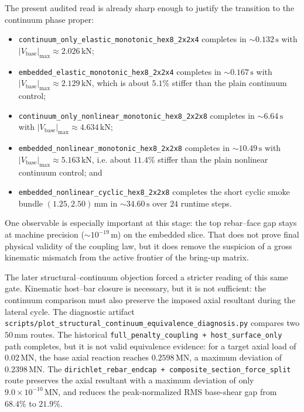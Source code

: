 The present audited read is already sharp enough to justify the transition to
the continuum phase proper:
\begin{itemize}
  \item \texttt{continuum\_only\_elastic\_monotonic\_hex8\_2x2x4} completes in
    \(\sim 0.132\,\mathrm{s}\) with
    \(|V_{\mathrm{base}}|_{\max} \approx 2.026\,\mathrm{kN}\);
  \item \texttt{embedded\_elastic\_monotonic\_hex8\_2x2x4} completes in
    \(\sim 0.167\,\mathrm{s}\) with
    \(|V_{\mathrm{base}}|_{\max} \approx 2.129\,\mathrm{kN}\), which is about
    \(5.1\%\) stiffer than the plain continuum control;
  \item \texttt{continuum\_only\_nonlinear\_monotonic\_hex8\_2x2x8} completes
    in \(\sim 6.64\,\mathrm{s}\) with
    \(|V_{\mathrm{base}}|_{\max} \approx 4.634\,\mathrm{kN}\);
  \item \texttt{embedded\_nonlinear\_monotonic\_hex8\_2x2x8} completes in
    \(\sim 10.49\,\mathrm{s}\) with
    \(|V_{\mathrm{base}}|_{\max} \approx 5.163\,\mathrm{kN}\), i.e. about
    \(11.4\%\) stiffer than the plain nonlinear continuum control; and
  \item \texttt{embedded\_nonlinear\_cyclic\_hex8\_2x2x8} completes the short
    cyclic smoke bundle \((1.25, 2.50)\,\mathrm{mm}\) in
    \(\sim 34.60\,\mathrm{s}\) over \(24\) runtime steps.
\end{itemize}

One observable is especially important at this stage: the top rebar--face gap
stays at machine precision (\(\sim 10^{-19}\,\mathrm{m}\)) on the embedded
slice. That does not prove final physical validity of the coupling law, but it
does remove the suspicion of a gross kinematic mismatch from the active
frontier of the bring-up matrix.

The later structural--continuum objection forced a stricter reading of this
same gate.  Kinematic host--bar closure is necessary, but it is not sufficient:
the continuum comparison must also preserve the imposed axial resultant during
the lateral cycle. The diagnostic artifact
\texttt{scripts/plot\_structural\_continuum\_equivalence\_diagnosis.py}
compares two \(50\,\mathrm{mm}\) routes. The historical
\texttt{full\_penalty\_coupling + host\_surface\_only} path completes, but it
is not valid equivalence evidence: for a target axial load of
\(0.02\,\mathrm{MN}\), the base axial reaction reaches
\(0.2598\,\mathrm{MN}\), a maximum deviation of \(0.2398\,\mathrm{MN}\). The
\texttt{dirichlet\_rebar\_endcap + composite\_section\_force\_split} route
preserves the axial resultant with a maximum deviation of only
\(9.0\times10^{-10}\,\mathrm{MN}\), and reduces the peak-normalized RMS
base-shear gap from \(68.4\%\) to \(21.9\%\).

